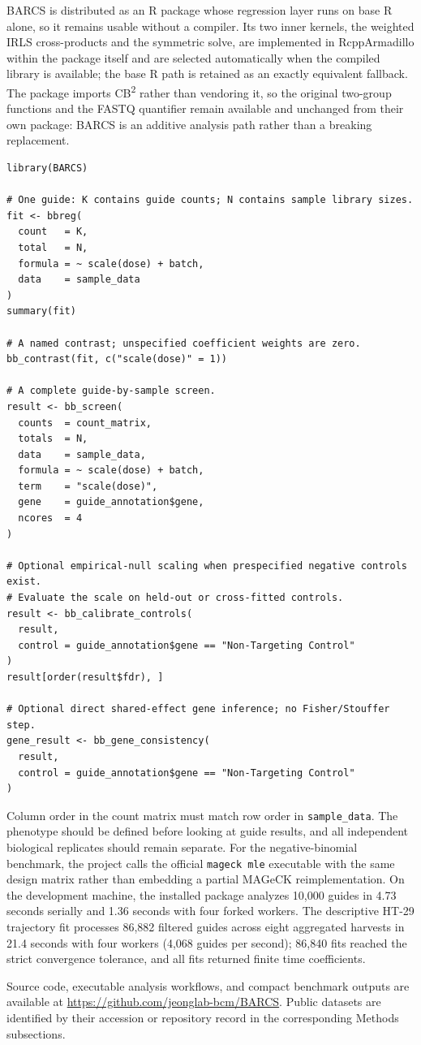 BARCS is distributed as an R package whose regression layer runs on base R
alone, so it remains usable without a compiler.  Its two inner kernels, the
weighted IRLS cross-products and the symmetric solve, are implemented in
RcppArmadillo \citep{eddelbuettel2014rcpparmadillo} within the package itself
and are selected automatically when the compiled library is available; the base
R path is retained as an exactly equivalent fallback.  The package imports
CB\textsuperscript{2} rather than vendoring it, so the original two-group
functions and the FASTQ quantifier remain available and unchanged from their
own package: BARCS is an additive analysis path rather than a breaking
replacement.
\begin{verbatim}
library(BARCS)

# One guide: K contains guide counts; N contains sample library sizes.
fit <- bbreg(
  count   = K,
  total   = N,
  formula = ~ scale(dose) + batch,
  data    = sample_data
)
summary(fit)

# A named contrast; unspecified coefficient weights are zero.
bb_contrast(fit, c("scale(dose)" = 1))

# A complete guide-by-sample screen.
result <- bb_screen(
  counts  = count_matrix,
  totals  = N,
  data    = sample_data,
  formula = ~ scale(dose) + batch,
  term    = "scale(dose)",
  gene    = guide_annotation$gene,
  ncores  = 4
)

# Optional empirical-null scaling when prespecified negative controls exist.
# Evaluate the scale on held-out or cross-fitted controls.
result <- bb_calibrate_controls(
  result,
  control = guide_annotation$gene == "Non-Targeting Control"
)
result[order(result$fdr), ]

# Optional direct shared-effect gene inference; no Fisher/Stouffer step.
gene_result <- bb_gene_consistency(
  result,
  control = guide_annotation$gene == "Non-Targeting Control"
)
\end{verbatim}
Column order in the count matrix must match row order in
\texttt{sample\_data}.  The phenotype should be defined before looking at guide
results, and all independent biological replicates should remain separate.
For the negative-binomial benchmark, the project calls the official
\texttt{mageck mle} executable with the same design matrix rather than
embedding a partial MAGeCK reimplementation.
On the development machine, the installed package analyzes 10,000 guides in
4.73 seconds serially and 1.36 seconds with four forked workers.  The
descriptive HT-29 trajectory fit processes 86,882 filtered guides across eight
aggregated harvests in 21.4 seconds with four workers (4,068 guides
per second); 86,840 fits reached the strict convergence tolerance, and all
fits returned finite time coefficients.

Source code, executable analysis workflows, and compact benchmark outputs are
available at \url{https://github.com/jeonglab-bcm/BARCS}.  Public datasets are
identified by their accession or repository record in the corresponding
Methods subsections.

